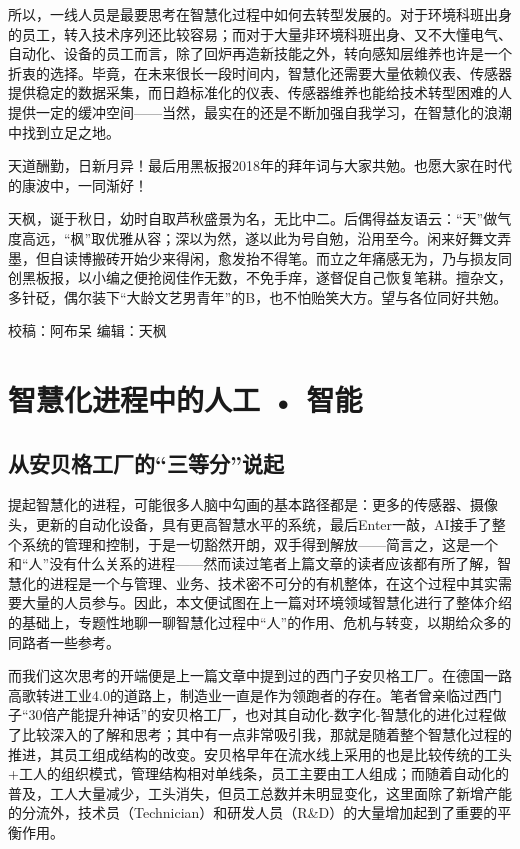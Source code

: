 \documentclass[]{book}
\begin{document}
所以，一线人员是最要思考在智慧化过程中如何去转型发展的。对于环境科班出身的员工，转入技术序列还比较容易；而对于大量非环境科班出身、又不大懂电气、自动化、设备的员工而言，除了回炉再造新技能之外，转向感知层维养也许是一个折衷的选择。毕竟，在未来很长一段时间内，智慧化还需要大量依赖仪表、传感器提供稳定的数据采集，而日趋标准化的仪表、传感器维养也能给技术转型困难的人提供一定的缓冲空间------当然，最实在的还是不断加强自我学习，在智慧化的浪潮中找到立足之地。

天道酬勤，日新月异！最后用黑板报2018年的拜年词与大家共勉。也愿大家在时代的康波中，一同渐好！

天枫，诞于秋日，幼时自取芦秋盛景为名，无比中二。后偶得益友语云：``天''做气度高远，``枫''取优雅从容；深以为然，遂以此为号自勉，沿用至今。闲来好舞文弄墨，但自读博搬砖开始少来得闲，愈发抬不得笔。而立之年痛感无为，乃与损友同创黑板报，以小编之便抢阅佳作无数，不免手痒，遂督促自己恢复笔耕。擅杂文，多针砭，偶尔装下``大龄文艺男青年''的B，也不怕贻笑大方。望与各位同好共勉。

校稿：阿布呆
编辑：天枫

\hypertarget{ux667aux6167ux5316ux8fdbux7a0bux4e2dux7684ux4ebaux5de5-ux667aux80fd}{%
\section{智慧化进程中的人工 • 智能}\label{ux667aux6167ux5316ux8fdbux7a0bux4e2dux7684ux4ebaux5de5-ux667aux80fd}}

\hypertarget{ux4eceux5b89ux8d1dux683cux5de5ux5382ux7684ux4e09ux7b49ux5206ux8bf4ux8d77}{%
\subsection{从安贝格工厂的``三等分''说起}\label{ux4eceux5b89ux8d1dux683cux5de5ux5382ux7684ux4e09ux7b49ux5206ux8bf4ux8d77}}

提起智慧化的进程，可能很多人脑中勾画的基本路径都是：更多的传感器、摄像头，更新的自动化设备，具有更高智慧水平的系统，最后Enter一敲，AI接手了整个系统的管理和控制，于是一切豁然开朗，双手得到解放------简言之，这是一个和``人''没有什么关系的进程------然而读过笔者上篇文章的读者应该都有所了解，智慧化的进程是一个与管理、业务、技术密不可分的有机整体，在这个过程中其实需要大量的人员参与。因此，本文便试图在上一篇对环境领域智慧化进行了整体介绍的基础上，专题性地聊一聊智慧化过程中``人''的作用、危机与转变，以期给众多的同路者一些参考。

而我们这次思考的开端便是上一篇文章中提到过的西门子安贝格工厂。在德国一路高歌转进工业4.0的道路上，制造业一直是作为领跑者的存在。笔者曾亲临过西门子``30倍产能提升神话''的安贝格工厂，也对其自动化-数字化-智慧化的进化过程做了比较深入的了解和思考；其中有一点非常吸引我，那就是随着整个智慧化过程的推进，其员工组成结构的改变。安贝格早年在流水线上采用的也是比较传统的工头+工人的组织模式，管理结构相对单线条，员工主要由工人组成；而随着自动化的普及，工人大量减少，工头消失，但员工总数并未明显变化，这里面除了新增产能的分流外，技术员（Technician）和研发人员（R\&D）的大量增加起到了重要的平衡作用。
\end{document}
